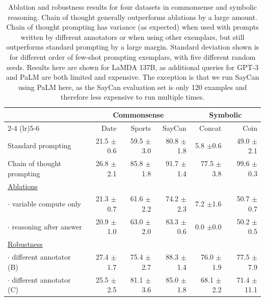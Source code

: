 \documentclass[]{article}
\theoremstyle{plain}
\theoremstyle{definition}
\theoremstyle{remark}
\newcommand{\lamda}[0]{LaMDA}
\newcommand{\palm}[0]{PaLM}
\newcommand{\cell}[2]{#1{ \scriptsize $\pm$#2}}
\begin{document}
\begingroup
\begin{table}[h]
    \centering
    \caption{
    Ablation and robustness results for four datasets in commonsense and symbolic reasoning.
    Chain of thought generally outperforms ablations by a large amount. 
    Chain of thought prompting has variance (as expected) when used with prompts written by different annotators or when using other exemplars, but still outperforms standard prompting by a large margin.
    Standard deviation shown is for different order of few-shot prompting exemplars, with five different random seeds.
    Results here are shown for \lamda{} 137B, as additional queries for GPT-3 and \palm{} are both limited and expensive.
    The exception is that we run SayCan using \palm{} here, as the SayCan evaluation set is only 120 examples and therefore less expensive to run multiple times.
    }
    \begin{tabular}{l rrr rr}
        \toprule
          & \multicolumn{3}{c}{Commonsense} & \multicolumn{2}{c}{Symbolic} \\
            \cmidrule(lr){2-4} \cmidrule(lr){5-6}
          & Date & Sports & SayCan & Concat & Coin \\
          \midrule 
          Standard prompting & \cell{21.5}{0.6} & \cell{59.5}{3.0} & \cell{80.8}{1.8} & \cell{5.8}{0.6} & \cell{49.0}{2.1} \\ \vspace{3mm}
          Chain of thought prompting & \cell{26.8}{2.1} & \cell{85.8}{1.8} &\cell{91.7}{1.4} & \cell{77.5}{3.8} & \cell{99.6}{0.3} \\
          \underline{Ablations} \\
          $\cdot$ variable compute only & \cell{21.3}{0.7} & \cell{61.6}{2.2} & \cell{74.2}{2.3} & \cell{7.2}{1.6} & \cell{50.7}{0.7} \\ \vspace{3mm}
          $\cdot$ reasoning after answer & \cell{20.9}{1.0} & \cell{63.0}{2.0} & \cell{83.3}{0.6}& \cell{0.0}{0.0} & \cell{50.2}{0.5} \\
          \underline{Robustness} \\
          $\cdot$ different annotator (B) & \cell{27.4}{1.7} & \cell{75.4}{2.7} & \cell{88.3}{1.4}& \cell{76.0}{1.9} & \cell{77.5}{7.9} \\
          $\cdot$ different annotator (C) & \cell{25.5}{2.5} & \cell{81.1}{3.6} & \cell{85.0}{1.8}& \cell{68.1}{2.2} & \cell{71.4}{11.1} \\
         \bottomrule
    \end{tabular}
    \label{tab:ablations-commonsense-symbolic}
\end{table}
\endgroup
\end{document}

